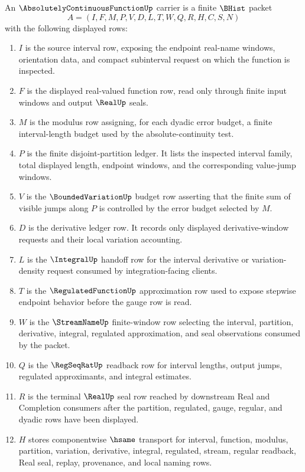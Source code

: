 \begin{definition}
\label{def:absolute-continuous-function-carrier}
An $\AbsolutelyContinuousFunctionUp$ carrier is a finite $\BHist$ packet
$$
A=(I,F,M,P,V,D,L,T,W,Q,R,H,C,S,N)
$$
with the following displayed rows:
\begin{enumerate}
\item $I$ is the source interval row, exposing the endpoint real-name windows, orientation data, and compact subinterval request on which the function is inspected.
\item $F$ is the displayed real-valued function row, read only through finite input windows and output $\RealUp$ seals.
\item $M$ is the modulus row assigning, for each dyadic error budget, a finite interval-length budget used by the absolute-continuity test.
\item $P$ is the finite disjoint-partition ledger. It lists the inspected interval family, total displayed length, endpoint windows, and the corresponding value-jump windows.
\item $V$ is the $\BoundedVariationUp$ budget row asserting that the finite sum of visible jumps along $P$ is controlled by the error budget selected by $M$.
\item $D$ is the derivative ledger row. It records only displayed derivative-window requests and their local variation accounting.
\item $L$ is the $\IntegralUp$ handoff row for the interval derivative or variation-density request consumed by integration-facing clients.
\item $T$ is the $\RegulatedFunctionUp$ approximation row used to expose stepwise endpoint behavior before the gauge row is read.
\item $W$ is the $\StreamNameUp$ finite-window row selecting the interval, partition, derivative, integral, regulated approximation, and seal observations consumed by the packet.
\item $Q$ is the $\RegSeqRatUp$ readback row for interval lengths, output jumps, regulated approximants, and integral estimates.
\item $R$ is the terminal $\RealUp$ seal row reached by downstream Real and Completion consumers after the partition, regulated, gauge, regular, and dyadic rows have been displayed.
\item $H$ stores componentwise $\hsame$ transport for interval, function, modulus, partition, variation, derivative, integral, regulated, stream, regular readback, Real seal, replay, provenance, and local naming rows.

\end{enumerate}
\end{definition}
